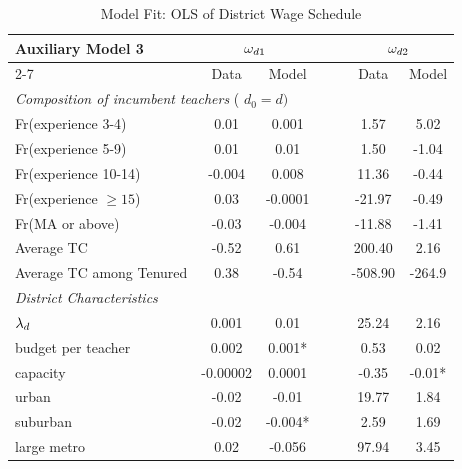 \documentclass[notitlepage,12pt]{article}%
\begin{document}
\begin{table}[ptb]
\caption{Model Fit: OLS of District Wage Schedule}
\begin{center}%
\begin{tabular}
[c]{lcccccc}\hline\hline
{\small Auxiliary Model 3} & \multicolumn{2}{c}{${\small \omega}_{d1}$} &  &
& \multicolumn{2}{c}{${\small \omega}_{d2}$}\\\cline{2-7}
& {\small Data} & {\small Model} &  &  & {\small Data} & {\small Model}%
\\\hline
\multicolumn{7}{l}{{\small \emph{Composition of incumbent teachers} (}%
$d_{0}=d)$}\\
{\small Fr(experience 3-4)} & {\small 0.01} & {\small 0.001} &  &  &
{\small 1.57} & {\small 5.02}\\
{\small Fr(experience 5-9)} & {\small 0.01} & {\small 0.01} &  &  &
{\small 1.50} & {\small -1.04}\\
{\small Fr(experience 10-14)} & {\small -0.004} & {\small 0.008} &  &  &
{\small 11.36} & {\small -0.44}\\
{\small Fr(experience }$\geq15${\small )} & {\small 0.03} & {\small -0.0001} &
&  & {\small -21.97} & {\small -0.49}\\
{\small Fr(MA or above)} & {\small -0.03} & {\small -0.004} &  &  &
{\small -11.88} & {\small -1.41}\\
{\small Average TC} & {\small -0.52} & {\small 0.61} &  &  & {\small 200.40} &
{\small 2.16}\\
{\small Average TC among Tenured} & {\small 0.38} & {\small -0.54} &  &  &
{\small -508.90} & {\small -264.9}\\
{\small \emph{District Characteristics}} &  &  &  &  &  & \\
${\small \lambda}_{d}$ & {\small 0.001} & {\small 0.01} &  &  & {\small 25.24}
& {\small 2.16}\\
{\small budget per teacher} & {\small 0.002} & {\small 0.001*} &  &  &
{\small 0.53} & {\small 0.02}\\
{\small capacity} & {\small -0.00002} & {\small 0.0001} &  &  & {\small -0.35}
& {\small -0.01*}\\
{\small urban} & {\small -0.02} & {\small -0.01} &  &  & {\small 19.77} &
{\small 1.84}\\
{\small suburban} & {\small -0.02} & {\small -0.004*} &  &  & {\small 2.59} &
{\small 1.69}\\
{\small large metro} & {\small 0.02} & {\small -0.056} &  &  & {\small 97.94}
& {\small 3.45}\\

\end{tabular}
\end{center}
\end{table}
\end{document}
